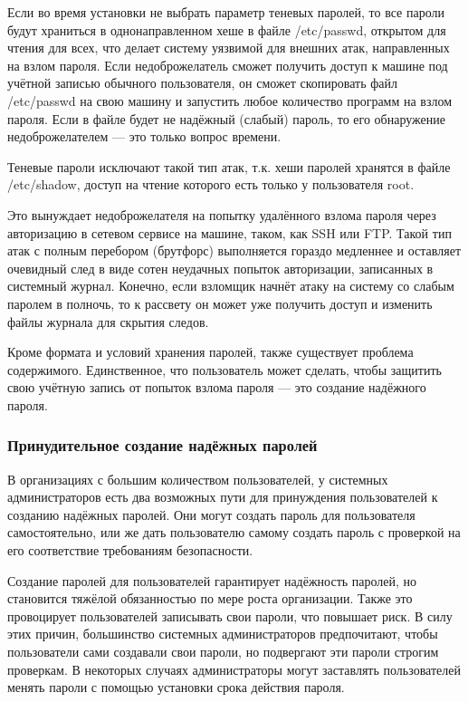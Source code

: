 \documentclass[a4paper,10pt,twoside]{article}
\begin{document}
Если во время установки не выбрать параметр теневых паролей, то все пароли будут храниться в однонаправленном хеше в файле /etc/passwd, открытом для чтения для всех, что делает систему уязвимой для внешних атак, направленных на взлом пароля. Если недоброжелатель сможет получить доступ к машине под учётной записью обычного пользователя, он сможет скопировать файл /etc/passwd на свою машину и запустить любое количество программ на взлом пароля. Если в файле будет не надёжный (слабый) пароль, то его обнаружение недоброжелателем — это только вопрос времени.

Теневые пароли исключают такой тип атак, т.к. хеши паролей хранятся в файле /etc/shadow, доступ на чтение которого есть только у пользователя root.

Это вынуждает недоброжелателя на попытку удалённого взлома пароля через авторизацию в сетевом сервисе на машине, таком, как SSH или FTP. Такой тип атак с полным перебором (брутфорс) выполняется гораздо медленнее и оставляет очевидный след в виде сотен неудачных попыток авторизации, записанных в системный журнал. Конечно, если взломщик начнёт атаку на систему со слабым паролем в полночь, то к рассвету он может уже получить доступ и изменить файлы журнала для скрытия следов.

Кроме формата и условий хранения паролей, также существует проблема содержимого. Единственное, что пользователь может сделать, чтобы защитить свою учётную запись от попыток взлома пароля — это создание надёжного пароля.

\subsubsection{Принудительное создание надёжных паролей}
В организациях с большим количеством пользователей, у системных администраторов есть два возможных пути для принуждения пользователей к созданию надёжных паролей. Они могут создать пароль для пользователя самостоятельно, или же дать пользователю самому создать пароль с проверкой на его соответствие требованиям безопасности.

Создание паролей для пользователей гарантирует надёжность паролей, но становится тяжёлой обязанностью по мере роста организации. Также это провоцирует пользователей записывать свои пароли, что повышает риск.  В силу этих причин, большинство системных администраторов предпочитают, чтобы пользователи сами создавали свои пароли, но подвергают эти пароли строгим проверкам. В некоторых случаях администраторы могут заставлять пользователей менять пароли с помощью установки срока действия пароля.
\end{document}
